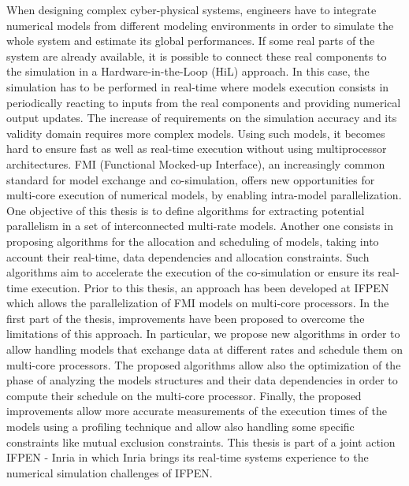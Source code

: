 When designing complex cyber-physical systems, engineers have to integrate numerical models
from different
modeling environments in order to simulate the whole system and estimate its global
performances. If some real parts of the system are already available, it is possible to connect these
real components to the simulation in a Hardware-in-the-Loop (HiL) approach. In this case, the
simulation has to be performed in real-time where models execution consists in periodically
reacting to inputs from the real components and providing numerical output updates. The
increase of requirements on the simulation accuracy and its validity domain requires more
complex models. Using such models, it becomes hard to ensure fast as well as real-time execution without using
multiprocessor architectures. FMI (Functional Mocked-up Interface), an increasingly common
standard for model exchange and co-simulation, offers
new opportunities for multi-core execution
of numerical models, by enabling intra-model parallelization. One objective of this thesis is to
define algorithms for extracting potential parallelism in a set of interconnected multi-rate models.
Another one consists in proposing algorithms for the allocation and scheduling of models, taking %
into account their real-time, data dependencies and allocation constraints. Such algorithms aim to accelerate the execution of the co-simulation or ensure its real-time execution. Prior to this thesis,
an approach has been developed at IFPEN which allows the parallelization of FMI models on
multi-core processors. In the first part of the thesis, improvements have been proposed to overcome
the limitations of this approach. In particular, we propose new algorithms in order to allow
handling models that exchange data at different
rates and schedule them on multi-core processors.
The proposed algorithms allow also the optimization of the phase of analyzing the models structures and
their data dependencies in order to compute their schedule on the multi-core processor. Finally, the
proposed improvements allow more accurate measurements of the execution times of the models using a profiling technique and allow also handling some specific constraints like mutual exclusion constraints. This thesis is part of a joint action IFPEN - Inria in which Inria brings its
real-time systems experience to the numerical simulation challenges of IFPEN.